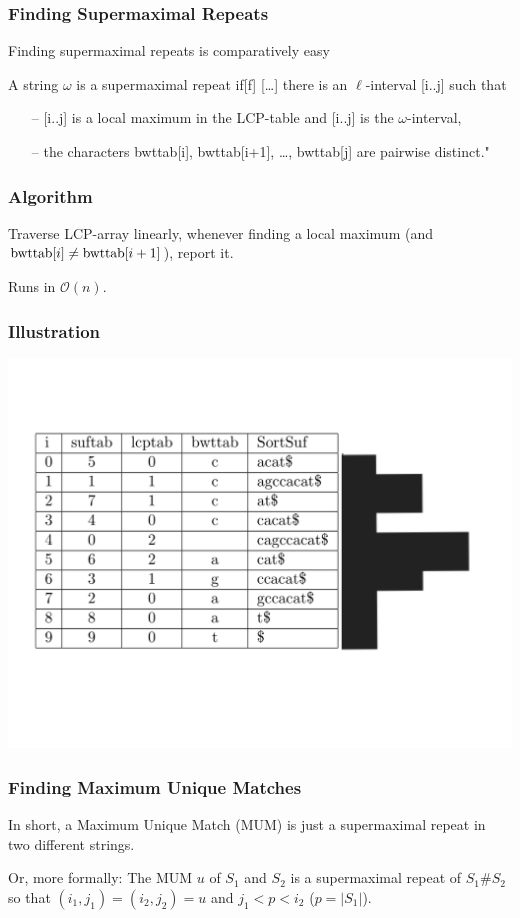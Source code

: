 \documentclass[compress,handout]{beamer} %
\renewcommand{\O}{\mathcal{O}}
\begin{document}
\begin{frame}
	\frametitle{Finding Supermaximal Repeats}
	Finding supermaximal repeats is comparatively easy

	\dq A string $\omega$ is a supermaximal repeat if[f] […] there is an
        $\ell$-interval [i..j] such that
	\begin{itemize}
		\item[–] [i..j] is a local maximum in the LCP-table and [i..j] is the $\omega$-interval,
		\item[–] the characters bwttab[i], bwttab[i+1], …, bwttab[j] are pairwise distinct."
	\end{itemize}
	\cite{abouelhoda2002enhanced}
\end{frame}

\begin{frame}
	\frametitle{Algorithm}
	Traverse LCP-array linearly, whenever finding a local maximum
	(and $\hbox{bwttab}[i] \neq \hbox{bwttab}[i+1]$), report it.

	Runs in $\O(n)$.
\end{frame}

\begin{frame}
	\frametitle{Illustration}
	\includegraphics[width=\textwidth, height=\textheight, keepaspectratio=true]{local_maxima}
\end{frame}

\begin{frame}
	\frametitle{Finding Maximum Unique Matches}
	In short, a Maximum Unique Match (MUM) is just a supermaximal
	repeat in two different strings.

	Or, more formally: The MUM $u$ of $S_1$ and $S_2$
	is a supermaximal repeat of $S_1\#S_2$ so that
	$(i_1,j_1)=(i_2,j_2)=u$ and $j_1<p<i_2$ ($p=|S_1|$).
\end{frame}
\end{document}
